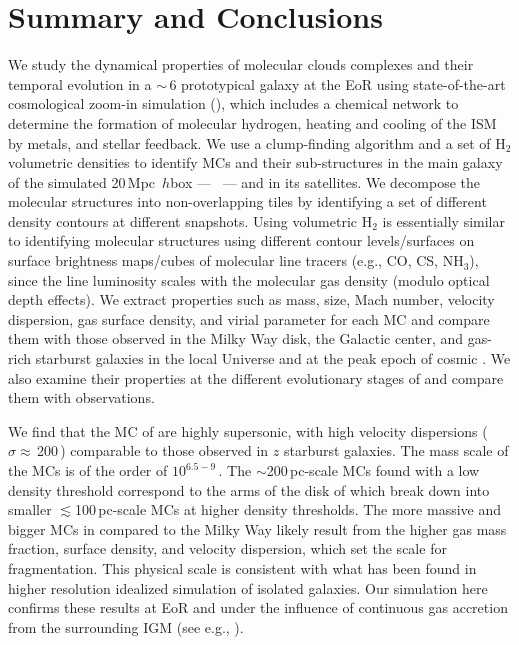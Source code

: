 \IfFileExists{emulateapjlegacy.cls}{\documentclass[iop]{emulateapjlegacy}}{\documentclass[iop]{emulateapj}}
\begin{document}
\section{Summary and Conclusions}      \label{sec:conclusion}

We study the dynamical properties of molecular clouds complexes and their temporal evolution in a \z$\sim$\,6 prototypical galaxy
at the EoR using state-of-the-art cosmological zoom-in simulation (),
which includes a chemical network to determine the formation of molecular
hydrogen, heating and cooling of the ISM by metals, and stellar feedback.
We use a clump-finding algorithm and a set of H$_2$ volumetric densities
to identify MCs and their sub-structures in the main galaxy of the
simulated 20\,Mpc~$h$\pmOne box --- \flower\ --- and in its satellites.
We decompose the molecular structures into non-overlapping tiles
by identifying a set of different density contours at different snapshots.
Using volumetric H$_2$ is essentially similar to identifying molecular structures using
different contour levels/surfaces on surface brightness maps/cubes of molecular line tracers (e.g., CO, CS, NH$_3$),
since the line luminosity scales with the molecular gas density (modulo optical depth effects).
We extract properties such as mass, size, Mach number, velocity dispersion, gas surface density, and virial parameter for each MC and
compare them with those observed in the Milky Way disk, the Galactic center,
and gas-rich starburst galaxies in the local Universe and at the peak epoch of cosmic \SF.
We also examine their properties at the different evolutionary stages of \flower and compare
them with observations.

We find that the MC of \flower are highly supersonic, with high velocity dispersions ($\sigma\approx$\,200\,\kms) comparable to
those observed in $z$ starburst galaxies.
The mass scale of the MCs is of the order of $10^{6.5-9}$\,\Msun. The $\sim$200\,pc-scale MCs found with a low density threshold
correspond to the arms of the disk of \flower which break down into smaller $\lesssim$100\,pc-scale MCs at higher density thresholds.
The more massive and bigger MCs in \flower compared to the Milky Way
likely result from the higher gas mass fraction, surface density, and velocity dispersion,
which set the scale for fragmentation.
This physical scale is 
consistent with what has been found in higher resolution idealized simulation of isolated galaxies.
Our simulation here confirms these results at EoR and under
the influence of continuous gas accretion from the surrounding IGM (see e.g., \citealt{Klessen10a, Goldbaum11a}).
\end{document}
